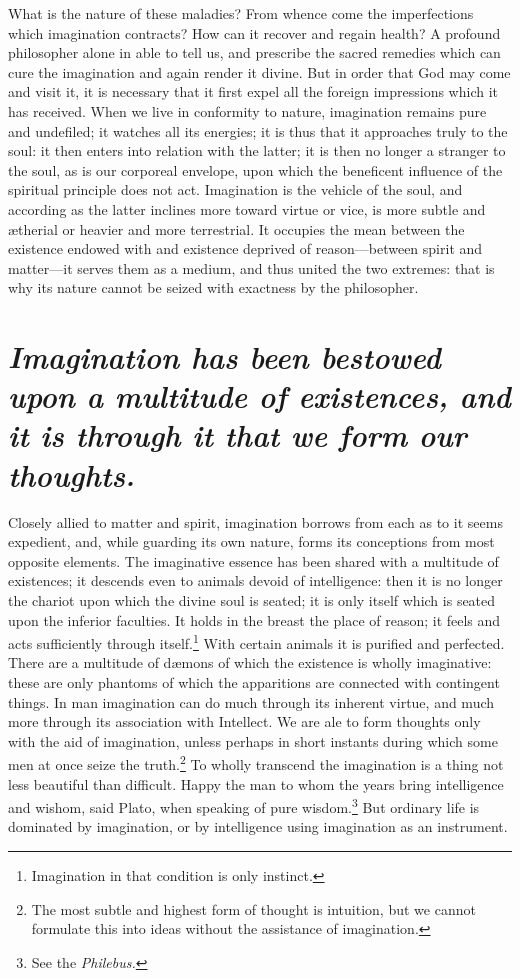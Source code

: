 \documentclass[12pt]{article}
\begin{document}
What is the nature of these maladies? From whence come the imperfections which
imagination contracts? How can it recover and regain health? A profound
philosopher alone in able to tell us, and prescribe the sacred remedies which
can cure the imagination and again render it divine. But in order that God may
come and visit it, it is necessary that it first expel all the foreign
impressions which it has received. When we live in conformity to nature,
imagination remains pure and undefiled; it watches all its energies; it is thus
that it approaches truly to the soul: it then enters into relation with the
latter; it is then no longer a stranger to the soul, as is our corporeal
envelope, upon which the beneficent influence of the spiritual principle does
not act. Imagination is the vehicle of the soul, and according as the latter
inclines more toward virtue or vice, is more subtle and {\ae}therial or heavier
and more terrestrial. It occupies the mean between the existence endowed with
and existence deprived of reason---between spirit and matter---it serves them
as a medium, and thus united the two extremes: that is why its nature cannot be
seized with exactness by the philosopher.


\section{\mdseries\itshape Imagination has been bestowed upon a multitude of
existences, and it is through it that we form our thoughts.}

Closely allied to matter and spirit, imagination borrows from each as to it
seems expedient, and, while guarding its own nature, forms its conceptions from
most opposite elements. The imaginative essence has been shared with a
multitude of existences; it descends even to animals devoid of intelligence:
then it is no longer the chariot upon which the divine soul is seated; it is
only itself which is seated upon the inferior faculties. It holds in the breast
the place of reason; it feels and acts sufficiently through
itself.\footnote{Imagination in that condition is only instinct.} With certain
animals it is purified and perfected. There are a multitude of d{\ae}mons of
which the existence is wholly imaginative: these are only phantoms of which the
apparitions are connected with contingent things. In man imagination can do
much through its inherent virtue, and much more through its association with
Intellect. We are ale to form thoughts only with the aid of imagination, unless
perhaps in short instants during which some men at once seize the
truth.\footnote{The most subtle and highest form of thought is intuition, but
we cannot formulate this into ideas without the assistance of imagination.} To
wholly transcend the imagination is a thing not less beautiful than difficult.
Happy the man to whom the years bring intelligence and wishom, said Plato, when
speaking of pure wisdom.\footnote{See the \textit{Philebus.}} But ordinary life
is dominated by imagination, or by intelligence using imagination as an
instrument.
\end{document}
